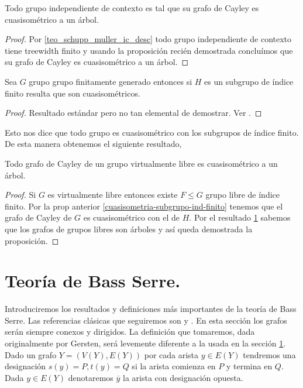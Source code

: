 \documentclass[tesis.tex]{subfiles}
\newcommand{\fg}{grupo finitamente generado }
\begin{document}
\begin{coro}
	Todo grupo independiente de contexto es tal que su grafo de Cayley es cuasisométrico a un árbol.
\end{coro}
\begin{proof}
	Por \ref{teo_schupp_muller_ic_desc} todo grupo independiente de contexto tiene treewidth finito y usando la proposición recién demostrada concluímos que su grafo de Cayley es cuasisométrico a un árbol.
\end{proof}
\medskip

\begin{prop}\label{cuasisometria-subgrupo-ind-finito}
	Sea $G$ grupo \fg entonces si $H$ es un subgrupo de índice finito resulta que son cuasisométricos.
\end{prop}
\begin{proof}
	Resultado estándar pero no tan elemental de demostrar. Ver \cite{loh2017geometric}.
\end{proof}

Esto nos dice que todo grupo es cuasisométrico con los subgrupos de índice finito. 
De esta manera obtenemos el siguiente resultado,

\begin{prop}
	Todo grafo de Cayley de un grupo virtualmente libre es cuasisométrico a un árbol.
\end{prop}

\begin{proof}
	Si $G$ es virtualmente libre entonces existe $F \le G$ grupo libre de índice finito.
	Por la prop anterior \ref{cuasisometria-subgrupo-ind-finito} tenemos que el grafo de Cayley de $G$ es cuasisométrico con el de $H$.
	Por el resultado \ref{} sabemos que los grafos de grupos libres son árboles y así queda demostrada la proposición.
\end{proof}

\section{Teoría de Bass Serre.}

Introduciremos los resultados y definiciones más importantes de la teoría de Bass Serre. 
Las referencias clásicas que seguiremos son \cite{serre2002trees} y \cite{}.
En esta sección los grafos serán siempre conexos y dirigidos.
La definición que tomaremos, dada originalmente por Gersten, será levemente diferente a la usada en la sección \ref{}.
Dado un grafo $Y= (V(Y),E(Y))$ por cada arista $y \in E(Y)$ tendremos una designación $s(y) = P, t(y) = Q$ si la arista comienza en $P$ y termina en $Q$.
Dada $y \in E(Y)$ denotaremos $\overline y$ la arista con designación opuesta.
\end{document}
